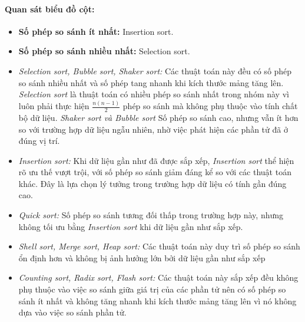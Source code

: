 \paragraph{Quan sát biểu đồ cột:}
\begin{itemize}
    \item \textbf{Số phép so sánh ít nhất:} Insertion sort.
    \item \textbf{Số phép so sánh nhiều nhất:} Selection sort.
    \item \textit{Selection sort, Bubble sort, Shaker sort:} Các thuật toán này đều có số phép so sánh nhiều nhất và số phép tang nhanh khi kích thước mảng tăng lên. \textit{Selection sort} là thuật toán có nhiều phép so sánh nhất trong nhóm này vì luôn phải thực hiện $\frac{n(n-1)}{2}$ phép so sánh mà không phụ thuộc vào tính chất bộ dữ liệu. \textit{Shaker sort và Bubble sort} Số phép so sánh cao, nhưng vẫn ít hơn so với trường hợp dữ liệu ngẫu nhiên, nhờ việc phát hiện các phần tử đã ở đúng vị trí.
    \item \textit{Insertion sort: }Khi dữ liệu gần như đã được sắp xếp, \textit{Insertion sort} thể hiện rõ ưu thế vượt trội, với số phép so sánh giảm đáng kể so với các thuật toán khác. Đây là lựa chọn lý tưởng trong trường hợp dữ liệu có tính gần đúng cao.
    \item \textit{Quick sort: }Số phép so sánh tương đối thấp trong trường hợp này, nhưng không tối ưu bằng \textit{Insertion sort} khi dữ liệu gần như sắp xếp.
    \item \textit{Shell sort, Merge sort, Heap sort: }Các thuật toán này duy trì số phép so sánh ổn định hơn và không bị ảnh hưởng lớn bởi dữ liệu gần như sắp xếp
    \item \textit{Counting sort, Radix sort, Flash sort:} Các thuật toán này sắp xếp đều không phụ thuộc vào việc so sánh giữa giá trị của các phần tử nên có số phép so sánh ít nhất và không tăng nhanh khi kích thước mảng tăng lên vì nó không dựa vào việc so sánh phần tử.
\end{itemize}
\newpage
